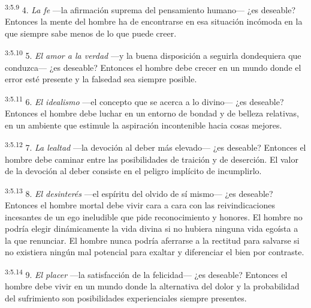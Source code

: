 \par
\textsuperscript{3:5.9} 4. \textit{La fe} ---la afirmación suprema del pensamiento humano--- ¿es deseable? Entonces la mente del hombre ha de encontrarse en esa situación incómoda en la que siempre sabe menos de lo que puede creer.

\par
\textsuperscript{3:5.10} 5. \textit{El amor a la verdad} ---y la buena disposición a seguirla dondequiera que conduzca--- ¿es deseable? Entonces el hombre debe crecer en un mundo donde el error esté presente y la falsedad sea siempre posible.

\par
\textsuperscript{3:5.11} 6. \textit{El idealismo} ---el concepto que se acerca a lo divino--- ¿es deseable? Entonces el hombre debe luchar en un entorno de bondad y de belleza relativas, en un ambiente que estimule la aspiración incontenible hacia cosas mejores.

\par
\textsuperscript{3:5.12} 7. \textit{La lealtad} ---la devoción al deber más elevado--- ¿es deseable? Entonces el hombre debe caminar entre las posibilidades de traición y de deserción. El valor de la devoción al deber consiste en el peligro implícito de incumplirlo.

\par
\textsuperscript{3:5.13} 8. \textit{El desinterés} ---el espíritu del olvido de sí mismo--- ¿es deseable? Entonces el hombre mortal debe vivir cara a cara con las reivindicaciones incesantes de un ego ineludible que pide reconocimiento y honores. El hombre no podría elegir dinámicamente la vida divina si no hubiera ninguna vida egoísta a la que renunciar. El hombre nunca podría aferrarse a la rectitud para salvarse si no existiera ningún mal potencial para exaltar y diferenciar el bien por contraste.

\par
\textsuperscript{3:5.14} 9. \textit{El placer} ---la satisfacción de la felicidad--- ¿es deseable? Entonces el hombre debe vivir en un mundo donde la alternativa del dolor y la probabilidad del sufrimiento son posibilidades experienciales siempre presentes.

